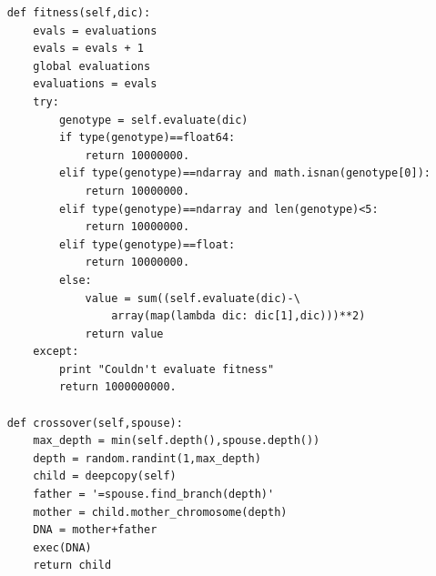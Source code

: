 \documentclass[11pt,amsmath,amssymb]{revtex4}
\begin{document}
\begin{lstlisting}
    def fitness(self,dic):
        evals = evaluations
        evals = evals + 1
        global evaluations
        evaluations = evals
        try:
            genotype = self.evaluate(dic)
            if type(genotype)==float64:
                return 10000000.
            elif type(genotype)==ndarray and math.isnan(genotype[0]):
                return 10000000.
            elif type(genotype)==ndarray and len(genotype)<5:
                return 10000000.
            elif type(genotype)==float:
                return 10000000.
            else:
                value = sum((self.evaluate(dic)-\
                    array(map(lambda dic: dic[1],dic)))**2)
                return value
        except:
            print "Couldn't evaluate fitness"
            return 1000000000.

    def crossover(self,spouse):
        max_depth = min(self.depth(),spouse.depth())
        depth = random.randint(1,max_depth)
        child = deepcopy(self)
        father = '=spouse.find_branch(depth)'
        mother = child.mother_chromosome(depth)
        DNA = mother+father
        exec(DNA)
        return child


\end{lstlisting}
\end{document}
